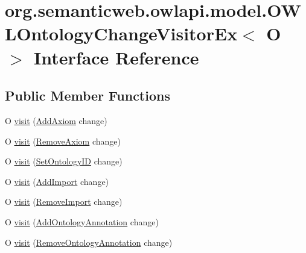 \hypertarget{interfaceorg_1_1semanticweb_1_1owlapi_1_1model_1_1_o_w_l_ontology_change_visitor_ex_3_01_o_01_4}{\section{org.\-semanticweb.\-owlapi.\-model.\-O\-W\-L\-Ontology\-Change\-Visitor\-Ex$<$ O $>$ Interface Reference}
\label{interfaceorg_1_1semanticweb_1_1owlapi_1_1model_1_1_o_w_l_ontology_change_visitor_ex_3_01_o_01_4}
}
\subsection*{Public Member Functions}
\begin{DoxyCompactItemize}
\item 
O \hyperlink{interfaceorg_1_1semanticweb_1_1owlapi_1_1model_1_1_o_w_l_ontology_change_visitor_ex_3_01_o_01_4_afdc92f5fc6833bbe2c5368089f086099}{visit} (\hyperlink{classorg_1_1semanticweb_1_1owlapi_1_1model_1_1_add_axiom}{Add\-Axiom} change)
\item 
O \hyperlink{interfaceorg_1_1semanticweb_1_1owlapi_1_1model_1_1_o_w_l_ontology_change_visitor_ex_3_01_o_01_4_af3150f1e83500adf96e59c7d65a070bb}{visit} (\hyperlink{classorg_1_1semanticweb_1_1owlapi_1_1model_1_1_remove_axiom}{Remove\-Axiom} change)
\item 
O \hyperlink{interfaceorg_1_1semanticweb_1_1owlapi_1_1model_1_1_o_w_l_ontology_change_visitor_ex_3_01_o_01_4_aac4e0b17c1d1bc988fb2725bb0a7657f}{visit} (\hyperlink{classorg_1_1semanticweb_1_1owlapi_1_1model_1_1_set_ontology_i_d}{Set\-Ontology\-I\-D} change)
\item 
O \hyperlink{interfaceorg_1_1semanticweb_1_1owlapi_1_1model_1_1_o_w_l_ontology_change_visitor_ex_3_01_o_01_4_a2f3a0f4054bf00da440ce6d19dccd16b}{visit} (\hyperlink{classorg_1_1semanticweb_1_1owlapi_1_1model_1_1_add_import}{Add\-Import} change)
\item 
O \hyperlink{interfaceorg_1_1semanticweb_1_1owlapi_1_1model_1_1_o_w_l_ontology_change_visitor_ex_3_01_o_01_4_a6ee681bd8e6b2ca43b77da5dbfb72a87}{visit} (\hyperlink{classorg_1_1semanticweb_1_1owlapi_1_1model_1_1_remove_import}{Remove\-Import} change)
\item 
O \hyperlink{interfaceorg_1_1semanticweb_1_1owlapi_1_1model_1_1_o_w_l_ontology_change_visitor_ex_3_01_o_01_4_a03967315bf225a5504d720bece7dca53}{visit} (\hyperlink{classorg_1_1semanticweb_1_1owlapi_1_1model_1_1_add_ontology_annotation}{Add\-Ontology\-Annotation} change)
\item 
O \hyperlink{interfaceorg_1_1semanticweb_1_1owlapi_1_1model_1_1_o_w_l_ontology_change_visitor_ex_3_01_o_01_4_a8c4173d8ab61a45c09b223ed573ed27e}{visit} (\hyperlink{classorg_1_1semanticweb_1_1owlapi_1_1model_1_1_remove_ontology_annotation}{Remove\-Ontology\-Annotation} change)
\end{DoxyCompactItemize}


